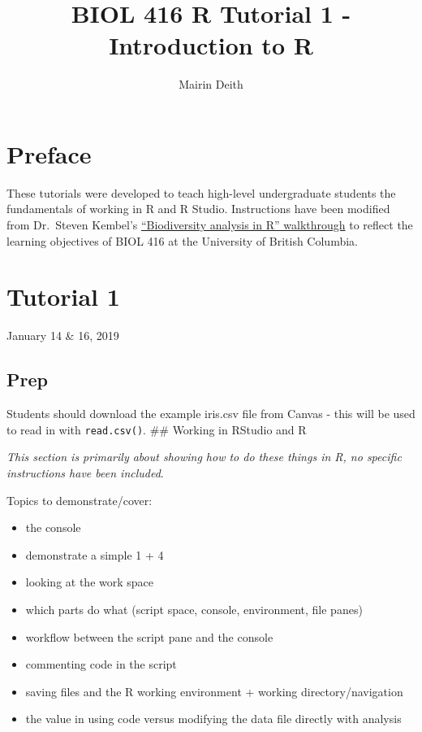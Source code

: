 \documentclass[]{article}
\title{BIOL 416 R Tutorial 1 - Introduction to R}
\author{Mairin Deith}
\date{}
\begin{document}
\maketitle

{
\setcounter{tocdepth}{2}
\tableofcontents
}
\section{Preface}\label{preface}

These tutorials were developed to teach high-level undergraduate
students the fundamentals of working in R and R Studio. Instructions
have been modified from Dr.~Steven Kembel's
\href{http://kembellab.ca/r-workshop/biodivR/SK_Biodiversity_R.html}{``Biodiversity
analysis in R'' walkthrough} to reflect the learning objectives of BIOL
416 at the University of British Columbia.

\section{Tutorial 1}\label{tutorial-1}

January 14 \& 16, 2019

\subsection{Prep}\label{prep}

Students should download the example iris.csv file from Canvas - this
will be used to read in with \texttt{read.csv()}. \#\# Working in
RStudio and R

\emph{This section is primarily about showing how to do these things in
R, no specific instructions have been included}.

Topics to demonstrate/cover:

\begin{itemize}
\item
  the console
\item
  demonstrate a simple 1 + 4
\item
  looking at the work space
\item
  which parts do what (script space, console, environment, file panes)
\item
  workflow between the script pane and the console
\item
  commenting code in the script
\item
  saving files and the R working environment + working
  directory/navigation
\item
  the value in using code versus modifying the data file directly with
  analysis
\end{itemize}
\end{document}
